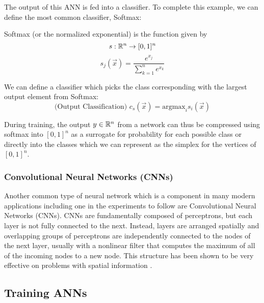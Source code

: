 

The output of this ANN is fed into a classifier. To complete this
example, we can define the most common classifier, Softmax:


\begin{definition}{Softmax (or the normalized exponential) is the function given by}
\[s : \mathbb{R}^n \to [0,1]^n\]
\[s_j(\vec x) = \frac{e^{x_j}}{\sum_{k = 1}^n e^{x_k}}\]
\end{definition}

\begin{definition}{We can define a classifier which picks the class corresponding with the largest output element from Softmax: }
\[\text{(Output Classification)  }   c_s(\vec x) = \text{argmax}_{i} s_i(\vec{x})\]
\end{definition}
During training, the output $y \in \mathbb{R}^n$ from a network can thus be compressed using softmax into $[0,1]^n$ as a surrogate for probability for each possible class or directly into the classes which we can represent as the simplex for the vertices of $[0,1]^n$. 

\cite{Bishop:2006:PRM:1162264}

\subsubsection{Convolutional Neural Networks (CNNs)}\label{cnn}

Another common type of neural network which is a component in many modern applications including one in the experiments to follow are Convolutional Neural Networks (CNNs). CNNs are fundamentally composed of
perceptrons, but each layer is not fully connected to the
next. Instead, layers are arranged spatially and overlapping groups of perceptrons are independently connected to the nodes of the next layer, usually with a nonlinear filter that computes the maximum of all of the incoming nodes to a new node. This structure has been shown to be very effective on problems with spatial information \cite{lecun1995convolutional}. 

\subsection{Training ANNs}


